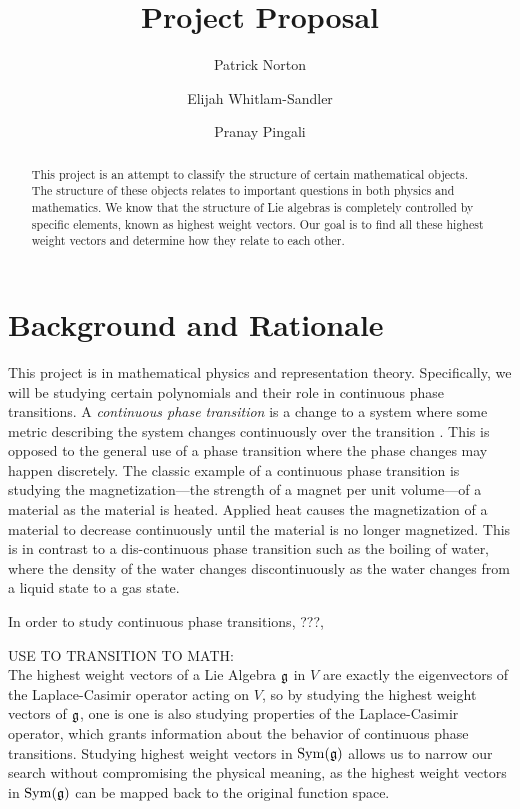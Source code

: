 \documentclass[11pt, reqno]{amsart}
\title{Project Proposal}
\author{Patrick Norton \and Elijah Whitlam-Sandler \and Pranay Pingali}
\begin{document}
\maketitle

\begin{abstract}
  This project is an attempt to classify the structure of certain mathematical
  objects. %
  The structure of these objects relates to important questions in both
  physics and mathematics. %
  We know that the structure of Lie algebras is completely controlled by
  specific elements, known as highest weight vectors. Our goal is to find all
  these highest weight vectors and determine how they relate to each other.
\end{abstract}

\section{Background and Rationale}

This project is in mathematical physics and representation theory. Specifically, we will be studying certain polynomials and their role in continuous phase transitions. A \emph{continuous phase transition} is a change to a system where some metric describing the system changes continuously over the transition \cite[\S1]{Sa06}. This is opposed to the general use of a phase transition where the phase changes may happen discretely. The classic example of a continuous phase transition is studying the magnetization---the strength of a magnet per unit volume---of a material as the material is heated. Applied heat causes the magnetization of a material to decrease continuously until the material is no longer magnetized. This is in contrast to a dis-continuous phase transition such as the boiling of water, where the density of the water changes discontinuously as the water changes from a liquid state to a gas state.

In order to study continuous phase transitions, ???, 

USE TO TRANSITION TO MATH:\\
The highest weight vectors of a Lie Algebra $\mathfrak{g}$ in $V$ are exactly the eigenvectors 
of the Laplace-Casimir operator acting on $V$, so by studying the highest weight  
vectors of $\mathfrak{g}$, one is one is also studying properties of the Laplace-Casimir 
operator, which grants information about the behavior of continuous phase transitions. 
Studying highest weight vectors in $\operatorname{Sym}(\mathfrak{g})$ allows us to narrow our search without
compromising the physical meaning, as the highest weight vectors in $\operatorname{Sym}(\mathfrak{g})$ can be mapped back to the original function space. 
\end{document}
